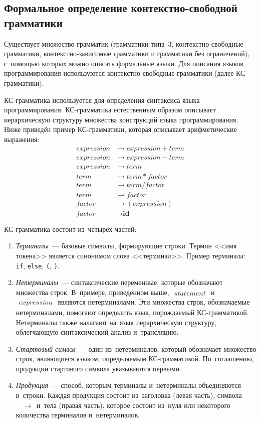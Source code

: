 \subsection{Формальное определение контекстно-свободной грамматики} \label{sub114}

Существует множество грамматик (грамматики типа~3, контекстно-свободные грамматики, контекстно-зависимые грамматики и грамматики без ограничений), с~помощью которых можно описать формальные языки. Для описания языков программирования используются контекстно-свободные грамматики  (далее КС-грамматики).

КС-грамматика используется для определения синтаксиса языка программирования. КС-грамматика естественным образом описывает иерархическую структуру множества конструкций языка программирования. Ниже приведён пример КС-грамматики, которая описывает арифметические выражения:
\begin{align*}
	expression &\to expression + term \\
	expression &\to expression - term \\
	expression &\to term \\
	term &\to term * factor \\
	term &\to term / factor \\ 
	term &\to factor \\
	factor &\to (expression) \\
	factor &\to \textbf{id}
\end{align*}

КС-грамматика состоит из~четырёх частей:
 
\begin{enumerate} 
	\item{\textit{Терминалы}~--- базовые символы, формирующие строки. Термин <<имя токена>> является синонимом слова <<терминал>>. Пример терминала: \texttt{if}, \texttt{else}, \texttt{(}, \texttt{)}}.
	\item{\textit{Нетерминалы}~--- синтаксические переменные, которые обозначают множества строк. В~примере, приведённом выше, $\begin{aligned} statement \end{aligned}$ и~$\begin{aligned} expression \end{aligned}$ являются нетерминалами. Эти множества строк, обозначаемые нетерминалами, помогают определить язык, порождаемый КС-грамматикой. Нетерминалы также налагают на~язык иерархическую структуру, облегчающую синтаксический анализ и~трансляцию.}
	\item{\textit{Стартовый символ}~--- один из~нетерминалов, который обозначает множество строк, являющиеся языком, определяемым КС-грамматикой. По~соглашению, продукции стартового символа указываются первыми.}
	\item{\textit{Продукция}~--- способ, которым терминалы и~нетерминалы объединяются в~строки. Каждая продукция состоит из~заголовка (левая часть), символа $\begin{aligned} &\to \end{aligned}$ и~тела (правая часть), которое состоит из~нуля или некоторого количества терминалов и~нетерминалов.}
\end{enumerate}
